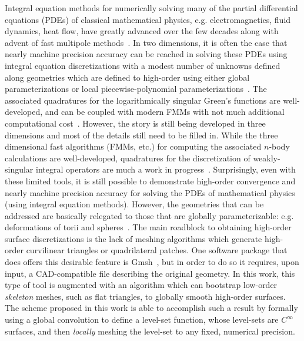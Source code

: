 \documentclass[11pt]{article}
\numberwithin{equation}{section}
\begin{document}
Integral equation methods for numerically solving many of the partial
differential equations (PDEs) of classical mathematical physics,
e.g. electromagnetics, fluid dynamics, heat flow, have greatly
advanced over the few decades along with advent of fast multipole
methods~\cite{song1997multilevel,coifman1993fast,tornberg-2008}. In
two dimensions, it is often the case that nearly machine precision
accuracy can be reached in solving these PDEs using integral equation
discretizations with a modest number of unknowns defined along
geometries which are defined to high-order using either global
parameterizations or local piecewise-polynomial
parameterizations~\cite{helsing2015determination,helsing}. The
associated quadratures for the logarithmically singular Green's
functions are well-developed, and can be coupled with modern FMMs with
not much additional computational cost~\cite{hao_2014,rachh_2016}.
However, the story is still being developed in three dimensions and
most of the details still need to be filled in.  While the three
dimensional fast algorithms (FMMs, etc.)  for computing the associated
$n$-body calculations are well-developed, quadratures for the
discretization of weakly-singular integral operators are much a work
in
progress~\cite{wala2018qbx,bremer-2015,bruno2001fast}. Surprisingly,
even with these limited tools, it is still possible to demonstrate
high-order convergence and nearly machine precision accuracy for solving
the PDEs of mathematical physics (using integral equation methods).
However, the geometries that can be
addressed are basically relegated to those that are globally
parameterizable: e.g. deformations of torii and
spheres~\cite{bremer-2015,oneil2018surface}.  The main roadblock to
obtaining high-order surface discretizations is the lack of meshing
algorithms which generate high-order curvilinear triangles or
quadrilateral patches.  One software package that does offers this
desirable 
feature is Gmsh~\cite{gmsh}, but in order to do so it requires, upon
input, a CAD-compatible file describing the original geometry.  In
this work, this type of tool is augmented with an algorithm which can
bootstrap low-order \emph{skeleton} meshes, such as flat triangles, to
globally smooth high-order surfaces. The scheme proposed in this work
is able to accomplish such a result by formally using a global
convolution to define a level-set function, whose level-sets are
$C^\infty$ surfaces, and then \emph{locally} meshing the level-set to
any fixed, numerical precision.
\end{document}
